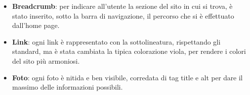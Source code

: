 \begin{itemize}
    \item \textbf{Breadcrumb}: per indicare all'utente la sezione del sito in cui si trova, \`e stato inserito, sotto la barra di navigazione, il percorso che si \`e effettuato dall'home page.

    \item \textbf{Link}: ogni link \`e rappresentato con la sottolineatura, rispettando gli standard, ma \`e stata cambiata la tipica colorazione viola, per rendere i colori del sito pi\`u armoniosi.

    \item \textbf{Foto}: ogni foto \`e nitida e ben visibile, corredata di tag title e alt per dare il massimo delle informazioni possibili.

\end{itemize}
